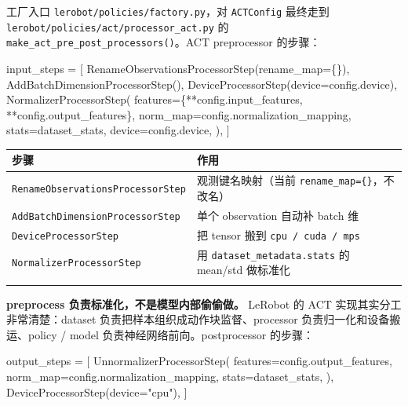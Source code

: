 \documentclass[
  chinese,
]{ctexart}
\newenvironment{Shaded}{\begin{snugshade}}{\end{snugshade}}
\newcommand{\NormalTok}[1]{\textcolor[rgb]{0.00,0.23,0.31}{#1}}
\newcommand{\OperatorTok}[1]{\textcolor[rgb]{0.37,0.37,0.37}{#1}}
\newcommand{\StringTok}[1]{\textcolor[rgb]{0.13,0.47,0.30}{#1}}
\begin{document}
工厂入口 \texttt{lerobot/policies/factory.py}，对 \texttt{ACTConfig}
最终走到 \texttt{lerobot/policies/act/processor\_act.py} 的
\texttt{make\_act\_pre\_post\_processors()}。ACT preprocessor 的步骤：

\begin{Shaded}
\begin{Highlighting}[]
\NormalTok{input\_steps }\OperatorTok{=}\NormalTok{ [}
\NormalTok{    RenameObservationsProcessorStep(rename\_map}\OperatorTok{=}\NormalTok{\{\}),}
\NormalTok{    AddBatchDimensionProcessorStep(),}
\NormalTok{    DeviceProcessorStep(device}\OperatorTok{=}\NormalTok{config.device),}
\NormalTok{    NormalizerProcessorStep(}
\NormalTok{        features}\OperatorTok{=}\NormalTok{\{}\OperatorTok{**}\NormalTok{config.input\_features, }\OperatorTok{**}\NormalTok{config.output\_features\},}
\NormalTok{        norm\_map}\OperatorTok{=}\NormalTok{config.normalization\_mapping,}
\NormalTok{        stats}\OperatorTok{=}\NormalTok{dataset\_stats,}
\NormalTok{        device}\OperatorTok{=}\NormalTok{config.device,}
\NormalTok{    ),}
\NormalTok{]}
\end{Highlighting}
\end{Shaded}

\begin{center}
\begin{tabular}{@{}>{\raggedright\arraybackslash}p{} >{\raggedright\arraybackslash}p{}@{}}
\toprule\noalign{}
步骤 & 作用 \\
\midrule\noalign{}
\texttt{RenameObservationsProcessorStep} & 观测键名映射（当前 \texttt{rename\_\allowbreak map=\{\}}，不改名） \\
\texttt{AddBatchDimensionProcessorStep} & 单个 observation 自动补 batch 维 \\
\texttt{DeviceProcessorStep} & 把 tensor 搬到 \texttt{cpu\ /\ cuda\ /\ mps} \\
\texttt{NormalizerProcessorStep} & 用 \texttt{dataset\_\allowbreak metadata.stats} 的 mean/std 做标准化 \\
\bottomrule\noalign{}
\end{tabular}
\end{center}

\textbf{preprocess 负责标准化，不是模型内部偷偷做。} LeRobot 的 ACT
实现其实分工非常清楚：dataset 负责把样本组织成动作块监督、processor
负责归一化和设备搬运、policy / model 负责神经网络前向。postprocessor
的步骤：

\begin{Shaded}
\begin{Highlighting}[]
\NormalTok{output\_steps }\OperatorTok{=}\NormalTok{ [}
\NormalTok{    UnnormalizerProcessorStep(}
\NormalTok{        features}\OperatorTok{=}\NormalTok{config.output\_features,}
\NormalTok{        norm\_map}\OperatorTok{=}\NormalTok{config.normalization\_mapping,}
\NormalTok{        stats}\OperatorTok{=}\NormalTok{dataset\_stats,}
\NormalTok{    ),}
\NormalTok{    DeviceProcessorStep(device}\OperatorTok{=}\StringTok{"cpu"}\NormalTok{),}
\NormalTok{]}
\end{Highlighting}
\end{Shaded}
\end{document}
